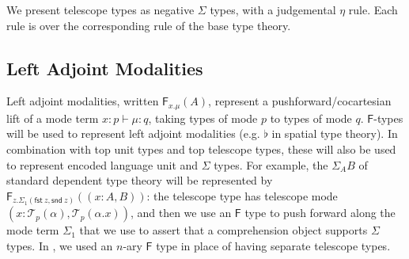 \documentclass[10pt]{article}
\theoremstyle{definition}
\newcommand\dsd[1]{\ensuremath{\mathsf{#1}}}
\newcommand{\yields}{\vdash}
\newcommand{\TYPE}{\,\,\mathsf{Type}}
\newcommand{\app}[2]{\ensuremath{#1 \: #2}}
\newcommand{\telety}[3]{\ensuremath{(#1{:}#2,#3)}}
\newcommand{\sigmacl}[3]{\ensuremath{(#1{:}#2,#3)}}
\newcommand{\fst}[1]{\app{\dsd{fst}}{#1}}
\newcommand{\snd}[1]{\app{\dsd{snd}}{#1}}
\newcommand\F[2]{\ensuremath{\mathsf{F}_{#1}(#2)}}
\newcommand\El[2]{\mathcal{T}_{#1}(#2)}
\begin{document}

We present telescope types as negative $\Sigma$ types, with a
judgemental $\eta$ rule.  Each rule is over the corresponding rule of
the base type theory.

\subsection{Left Adjoint Modalities}

Left adjoint modalities, written $\F{x.\mu}{A}$, represent a
pushforward/cocartesian lift of a mode term $x : p \vdash \mu : q$, taking
types of mode $p$ to types of mode $q$.  $\mathsf{F}$-types will be used
to represent left adjoint modalities (e.g. $\flat$ in spatial type
theory).  In combination with top unit types and top telescope types,
these will also be used to represent encoded language unit and $\Sigma$
types.  For example, the $\Sigma_A B$ of standard dependent type theory
will be represented by $\F{z.\Sigma_1(\fst z, \snd
  z)}{\telety{x}{A}{B}}$: the telescope type has telescope mode
$\sigmacl{x}{\El{p}{\alpha}}{\El{p}{\alpha.x}}$, and then we use an
$\mathsf{F}$ type to push forward along the mode term $\Sigma_1$ that we
use to assert that a comprehension object supports $\Sigma$ types.
In , we used an $n$-ary $\mathsf{F}$ type in
place of having separate telescope types.
\end{document}
